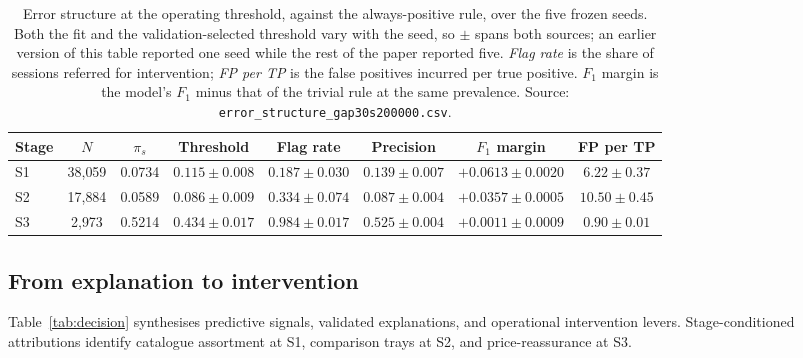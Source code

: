 \documentclass[a4paper]{article}
\begin{document}
\begin{table}[htbp]
\centering
\caption{Error structure at the operating threshold, against the
always-positive rule, over the five frozen seeds. Both the fit and the
validation-selected threshold vary with the seed, so $\pm$ spans both sources;
an earlier version of this table reported one seed while the rest of the paper
reported five. \emph{Flag rate} is the share of sessions referred for
intervention; \emph{FP per TP} is the false positives incurred per true
positive. $F_1$ margin is the model's $F_1$ minus that of the trivial rule at
the same prevalence. Source:
\texttt{error\_structure\_gap30s200000.csv}.}
\label{tab:error}
\small
\begin{tabular}{@{}lccccccc@{}}
\toprule
\textbf{Stage} & $N$ & $\pi_s$ & \textbf{Threshold} & \textbf{Flag rate} &
\textbf{Precision} & $F_1$ \textbf{margin} & \textbf{FP per TP} \\
\midrule
S1 & 38{,}059 & 0.0734 & $0.115 \pm 0.008$ & $0.187 \pm 0.030$ & $0.139 \pm 0.007$ & $+0.0613 \pm 0.0020$ & $6.22 \pm 0.37$ \\
S2 & 17{,}884 & 0.0589 & $0.086 \pm 0.009$ & $0.334 \pm 0.074$ & $0.087 \pm 0.004$ & $+0.0357 \pm 0.0005$ & $10.50 \pm 0.45$ \\
S3 &  2{,}973 & 0.5214 & $0.434 \pm 0.017$ & $0.984 \pm 0.017$ & $0.525 \pm 0.004$ & $+0.0011 \pm 0.0009$ & $0.90 \pm 0.01$ \\
\bottomrule
\end{tabular}
\end{table}

\subsection{From explanation to intervention}
\label{sec:explanation-to-intervention}

Table~\ref{tab:decision} synthesises predictive signals, validated explanations,
and operational intervention levers. Stage-conditioned attributions identify
catalogue assortment at S1, comparison trays at S2, and price-reassurance at S3.
\end{document}
